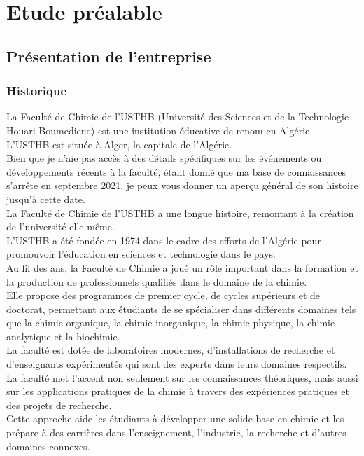 
\chapter{Etude préalable}
\section{Présentation de l’entreprise }
\subsection{Historique }
La Faculté de Chimie de l'USTHB (Université des Sciences et de la Technologie Houari Boumediene) 
est une institution éducative de renom en Algérie.\\
 L'USTHB est située à Alger, la capitale de l'Algérie. \\
 Bien que je n'aie pas accès à des détails spécifiques sur les événements ou développements récents à la faculté, 
 étant donné que ma base de connaissances s'arrête en septembre 2021, 
 je peux vous donner un aperçu général de son histoire jusqu'à cette date.\\
La Faculté de Chimie de l'USTHB a une longue histoire, remontant à la création de l'université elle-même.\\
 L'USTHB a été fondée en 1974 dans le cadre des efforts de l'Algérie pour promouvoir l'éducation en sciences et technologie dans le pays. \\

Au fil des ans, la Faculté de Chimie a joué un rôle important dans la formation 
et la production de professionnels qualifiés dans le domaine de la chimie.
\\ Elle propose des programmes de premier cycle, de cycles supérieurs et de doctorat, 
permettant aux étudiants de se spécialiser dans différents domaines tels que la chimie organique, 
la chimie inorganique, la chimie physique, la chimie analytique et la biochimie.\\

La faculté est dotée de laboratoires modernes, d'installations de recherche et d'enseignants expérimentés qui sont des experts dans leurs domaines respectifs.\\
La faculté met l'accent non seulement sur les connaissances théoriques, 
mais aussi sur les applications pratiques de la chimie à travers des expériences pratiques et des projets de recherche.\\
Cette approche aide les étudiants à développer une solide base en chimie et les prépare à des carrières dans l'enseignement,
l'industrie, la recherche et d'autres domaines connexes.\\

